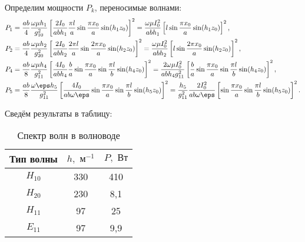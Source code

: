 \documentclass[a4paper,14pt]{extarticle}
\begin{document}
	Определим мощности \( P_k \), переносимые волнами:
	\begin{align*}
		P_1 &= \frac{ab}{4}\frac{\omega\mu h_1}{g_{10}^2}\left[\frac{2I_0}{ab h_1} \frac{\pi l}{a}\sin\frac{\pi x_0}{a}\sin(h_1z_0)\right]^2= 
		\frac{\omega\mu I_0^2}{ab h_1}\left[l\sin\frac{\pi x_0}{a}\sin(h_1z_0)\right]^2,\\
		P_2 &= \frac{ab}{4}\frac{\omega\mu h_2}{g_{20}^2}\left[\frac{2I_0}{ab h_2} \frac{2\pi l}{a}\sin\frac{2\pi x_0}{a}\sin(h_2z_0)\right]^2= 
		\frac{\omega\mu I_0^2}{ab h_2}\left[l\sin\frac{2\pi x_0}{a}\sin(h_2z_0)\right]^2,\\
		P_4 &= \frac{ab}{8}\frac{\omega\mu h_4}{g_{11}^2}\left[\frac{4I_0}{ab h_4} \frac{b}{a}\sin\frac{\pi x_0}{a}\sin\frac{\pi l}{b}\sin(h_4z_0)\right]^2 = \frac{2\omega\mu I_0^2}{abh_4g_{11}^2}\left[\frac{b}{a}\sin\frac{\pi x_0}{a}\sin\frac{\pi l}{b}\sin(h_4z_0)\right]^2,\\
		P_5 &= \frac{ab}{8}\frac{\omega\eps h_5}{g_{11}^2} \left[\frac{4I_0}{ab\omega\eps} \sin\frac{\pi x_0}{a}\sin\frac{\pi l}{b}\sin(h_5z_0)\right]^2 =
		\frac{h_5}{g_{11}^2} \frac{2I_0^2}{ab\omega\eps} \left[\sin\frac{\pi x_0}{a}\sin\frac{\pi l}{b}\sin(h_5z_0)\right]^2.
	\end{align*}

	Сведём результаты в таблицу:
	\begin{table}[h]
		\center
		\caption{Спектр волн в волноводе}
		\begin{tabular}{|c|c|c|}\hline
		Тип волны & $h,\text{ м}^{-1}$ & $P,\text{ Вт}$ \\ \hline
		$H_{10}$ & 330 & 410 \\
		$H_{20}$ & 230 & 8,1 \\
		$H_{11}$ & 97 & 25 \\
		$E_{11}$ & 97 & 9,9 \\ \hline
		\end{tabular}
	\end{table}
\end{document}
